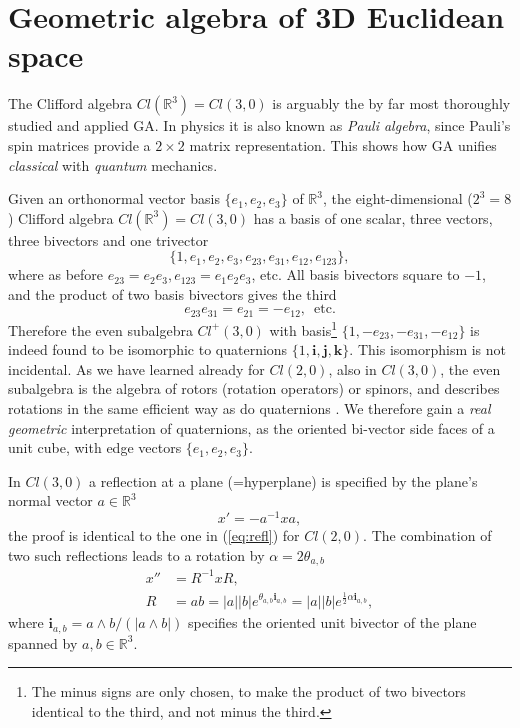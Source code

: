\documentclass[cameraready]{jcmsi}%
\newcommand{\R}{\mathbb{R}}
\newcommand{\be}{\begin{equation}}
\newcommand{\ee}{\end{equation}}
\begin{document}
\section{Geometric algebra of 3D Euclidean space}

The Clifford algebra $Cl(\R^3) = Cl(3,0)$ is arguably the by far most thoroughly studied and applied GA. In physics it is also known as \textit{Pauli algebra}, since Pauli's spin matrices provide a $2\times 2$ matrix representation. This shows how GA unifies \textit{classical} with \textit{quantum} mechanics. 

Given an orthonormal vector basis $\{e_1, e_2, e_3\}$ of $\R^3$, the eight-dimensional ($2^3=8$) Clifford algebra $Cl(\R^3) = Cl(3,0)$ has a basis of one scalar, three vectors, three bivectors and one trivector
\be 
  \{1, e_1, e_2, e_3, e_{23}, e_{31}, e_{12}, e_{123}\},
  \label{eq:Cl3basis}
\ee 
where as before $e_{23}=e_2e_3, e_{123} = e_1e_2e_3$, etc. All basis bivectors square to $-1$, and the product of two basis bivectors gives the third
\be 
  e_{23} e_{31} = e_{21} = - e_{12}, \,\,\, \text{etc.}
\ee 
Therefore the even subalgebra $Cl^+(3,0)$ with basis\footnote{The minus signs are only chosen, to make the product of two bivectors identical to the third, and not minus the third.} $\{1, -e_{23}, -e_{31}, -e_{12}\}$ is indeed found to be isomorphic to quaternions $\{1, \mathbf{i}, \mathbf{j}, \mathbf{k}\}$. This isomorphism is not incidental. As we have learned already for $Cl(2,0)$, also in $Cl(3,0)$, the even subalgebra is the algebra of rotors (rotation operators) or spinors, and describes rotations in the same efficient way as do quaternions \cite{Wiki:EucGroup}. We therefore gain a \textit{real geometric} interpretation of quaternions, as the oriented bi-vector side faces of a unit cube, with edge vectors $\{e_1, e_2, e_3\}$. 

In $Cl(3,0)$ a reflection at a plane (=hyperplane) is specified by the plane's normal vector $a\in\R^3$
\be 
  x' = -a^{-1} x a,
\ee 
the proof is identical to the one in (\ref{eq:refl}) for $Cl(2,0)$. The combination of two such reflections leads to a rotation by $\alpha = 2 \theta_{a,b}$
\begin{align} 
  x'' &= R^{-1} x R, 
  \\ 
  R &= ab = |a||b| e^{\theta_{a,b}\mathbf{i}_{a,b}}
  = |a||b| e^{\frac{1}{2}\alpha \mathbf{i}_{a,b}},
  \nonumber
\end{align} 
where $\mathbf{i}_{a,b}={a \wedge b}/({|a\wedge b|})$ specifies the oriented unit bivector of the plane spanned by $a,b \in \R^3$. 
\end{document}
